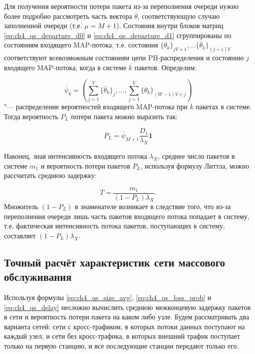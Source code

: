 Для получения вероятности потери пакета из-за переполнения очереди нужно более подробно рассмотреть часть вектора $\overline{\theta}$, соответствующую случаю заполненной очереди (т.е. $\mu=M+1$). Состояния внутри блоков матриц \eqref{eq:ch4_qs_departure_d0} и \eqref{eq:ch4_qs_departure_d1} сгруппированы по состояниям входящего MAP-потока, т.е. состояния $\{ \overline{\theta}_k \}_{jV + 1}, \dots \{ \overline{\theta}_k \}_{(j+1)V}$ соответствуют всевозможным состояниям цепи PH-распределения и состоянию $j$ входящего MAP-потока, когда в системе $k$ пакетов. Определим:

\begin{equation}
    \label{eq:ch4_qs_size_slice_pmf}
    \overline{\psi}_k = ( \sum\limits_{j=1}^{V}\{ \overline{\theta}_k \}_j, \dots, \sum\limits_{j=1}^{V}\{ \overline{\theta}_{k} \}_{(W-1)V + j} )
\end{equation}
"--- распределение вероятностей входящего MAP-потока при $k$ пакетах в системе. Тогда вероятность $P_L$ потери пакета можно выразить так:

\begin{equation}
  \label{eq:ch4_qs_loss_prob}
  P_L = \overline{\psi}_{M+1} \frac{D_1}{\lambda_X}\overline{\mathbf{1}}
\end{equation}

Наконец, зная интенсивность входящего потока $\lambda_{X}$, среднее число пакетов в системе $m_1$ и вероятность потери пакетов $P_L$, используя формулу Литтла, можно рассчитать среднюю задержку:

\begin{equation}
	\label{eq:ch4_qs_delay}
	T = \frac{m_1}{(1 - P_L)\lambda_{X}}.
\end{equation}
Множитель $(1 - P_L)$ в знаменателе возникает в следствие того, что из-за переполнения очереди лишь часть пакетов входящего потока попадает в систему, т.е. фактическая интенсивность потока пакетов, поступающих в систему, составляет $(1 - P_L) \lambda_{X}$.



\subsection{Точный расчёт характеристик сети массового обслуживания}\label{sec:ch4_queue_net_precise}


Используя формулы \eqref{eq:ch4_qs_size_avg}, \eqref{eq:ch4_qs_loss_prob} и \eqref{eq:ch4_qs_delay} несложно вычислить среднюю межконцевую задержку пакетов в сети и вероятность потери пакета на каком либо узле. Будем рассматривать два варианта сетей: сети с кросс-трафиком, в которых потоки данных поступают на каждый узел, и сети без кросс-трафика, в которых внешний трафик поступает только на первую станцию, и все последующие станции передают только его.

